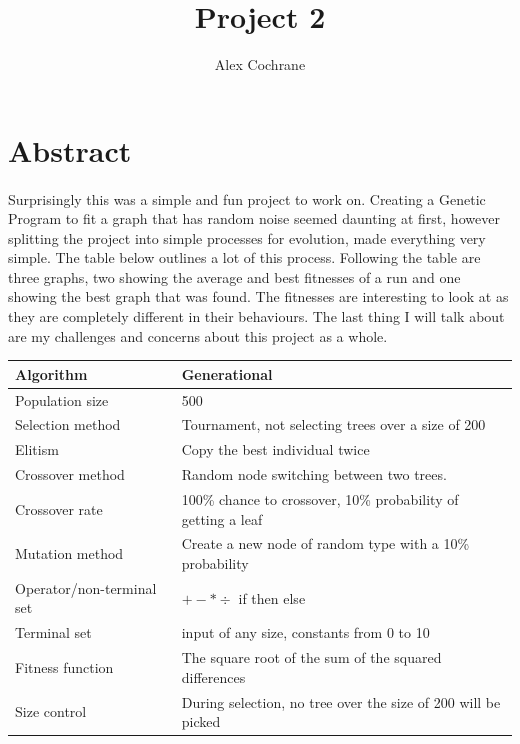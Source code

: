 \documentclass[11pt]{article} %
\title{Project 2}
\author{Alex Cochrane}
\begin{document}
\maketitle

\section{Abstract}

\paragraph{} Surprisingly this was a simple and fun project to work on. Creating a Genetic Program to fit a graph that has random noise seemed daunting at first, however splitting the project into simple processes for evolution, made everything very simple. The table below outlines a lot of this process. Following the table are three graphs, two showing the average and best fitnesses of a run and one showing the best graph that was found. The fitnesses are interesting to look at as they are completely different in their behaviours. The last thing I will talk about are my challenges and concerns about this project as a whole.
\newline

\begin{tabular}{|l|p{4in}|}
\hline
Algorithm & Generational\\
\hline
Population size & 500\\
\hline
Selection method & Tournament, not selecting trees over a size of 200\\
\hline
Elitism & Copy the best individual twice\\
\hline
Crossover method & Random node switching between two trees.\\
\hline
Crossover rate & 100\% chance to crossover, 10\% probability of getting a leaf\\
\hline
Mutation method & Create a new node of random type with a 10\% probability\\
\hline
Operator/non-terminal set & $+ - * \div$ if then else\\
\hline
Terminal set & input of any size, constants from 0 to 10\\
\hline
Fitness function & The square root of the sum of the squared differences\\
\hline
Size control & During selection, no tree over the size of 200 will be picked\\
\hline
\end{tabular}
\end{document}

